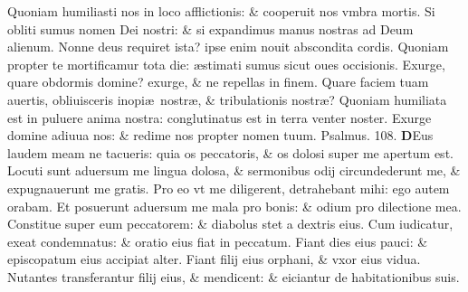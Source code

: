 \documentclass[a5paper,10pt]{book}
\def\ae{æ}
\begin{document}
\begin{multicols*}{2}
\newline \color{red} Q\color{black}uoniam humiliasti nos in loco afflictionis: \& cooperuit nos vmbra mortis.
\newline \color{red} S\color{black}i obliti sumus nomen Dei nostri: \& si expandimus manus nostras ad Deum alienum.
\newline \color{red} N\color{black}onne deus requiret ista? ipse enim nouit abscondita cordis.
\newline \color{red} Q\color{black}uoniam propter te mortificamur tota die: \ae stimati sumus sicut oues occisionis.
\newline \color{red} E\color{black}xurge, quare obdormis domine? exurge, \& ne repellas in finem.
\newline \color{red} Q\color{black}uare faciem tuam auertis, obliuisceris inopi\ae \ nostr\ae , \& tribulationis nostr\ae ?
\newline \color{red} Q\color{black}uoniam humiliata est in puluere anima nostra: conglutinatus est in terra venter noster.
\newline \color{red} E\color{black}xurge domine adiuua nos: \& redime nos propter nomen tuum.
\newline \color{red} Psalmus. \hypertarget{ps108}{108.} \color{black}
\vspace{-1em}
\lettrine[lines=2]{\bfseries \color{red} D}{}Eus laudem meam ne tacueris: quia os peccatoris, \& os dolosi super me apertum est.
\newline \color{red} L\color{black}ocuti sunt aduersum me lingua dolosa, \& sermonibus odij circundederunt me, \& expugnauerunt me gratis.
\newline \color{red} P\color{black}ro eo vt me diligerent, detrahebant mihi: ego autem orabam.
\newline \color{red} E\color{black}t posuerunt aduersum me mala pro bonis: \& odium pro dilectione mea.
\newline \color{red} C\color{black}onstitue super eum peccatorem: \& diabolus stet a dextris eius.
\newline \color{red} C\color{black}um iudicatur, exeat condemnatus: \& oratio eius fiat in peccatum.
\newline \color{red} F\color{black}iant dies eius pauci: \& episcopatum eius accipiat alter.
\newline \color{red} F\color{black}iant filij eius orphani, \& vxor eius vidua.
\newline \color{red} N\color{black}utantes transferantur filij eius, \& mendicent: \& eiciantur de habitationibus suis.

\end{multicols*}
\end{document}
